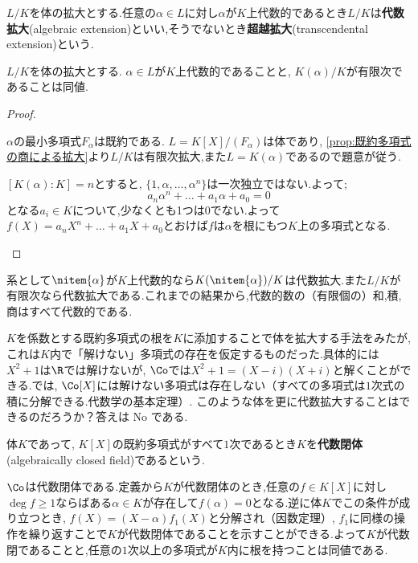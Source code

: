 \begin{defi}
	$L/K$を体の拡大とする.任意の$\alpha\in L$に対し$\alpha$が$K$上代数的であるとき$L/K$は\textbf{代数拡大}(algebraic extension)といい,そうでないとき\textbf{超越拡大}(transcendental extension)という.
\end{defi}

\begin{prop}
	$L/K$を体の拡大とする. $\alpha\in L$が$K$上代数的であることと, $K(\alpha)/K$が有限次であることは同値.
\end{prop}

\begin{proof}
	\begin{eqv}
		\item $\alpha$の最小多項式$F_\alpha$は既約である. $L=K[X]/(F_\alpha)$は体であり, \ref{prop:既約多項式の商による拡大}より$L/K$は有限次拡大,また$L=K(\alpha)$であるので題意が従う.
		
		\item $[K(\alpha):K]=n$とすると, $\{1,\alpha,\dots,\alpha^n\}$は一次独立ではない.よって;
		\[a_n\alpha^n+\dots+a_1\alpha+a_0=0\]
		となる$a_i\in K$について,少なくとも1つは0でない.よって$f(X)=a_nX^n+\dots+a_1X+a_0$とおけば$f$は$\alpha$を根にもつ$K$上の多項式となる.
	\end{eqv}
\end{proof}

系として$\nitem{\alpha}$が$K$上代数的なら$K(\nitem{\alpha})/K$は代数拡大.また$L/K$が有限次なら代数拡大である.これまでの結果から,代数的数の（有限個の）和,積,商はすべて代数的である.

$K$を係数とする既約多項式の根を$K$に添加することで体を拡大する手法をみたが,これは$K$内で「解けない」多項式の存在を仮定するものだった.具体的には$X^2+1$は$\R$では解けないが, $\Co$では$X^2+1=(X-i)(X+i)$と解くことができる.では, $\Co[X]$には解けない多項式は存在しない（すべての多項式は$1$次式の積に分解できる.代数学の基本定理）. このような体を更に代数拡大することはできるのだろうか？答えは No である.

\begin{defi}[代数閉体]
	体$K$であって, $K[X]$の既約多項式がすべて$1$次であるとき$K$を\textbf{代数閉体}(algebraically closed field)であるという.
\end{defi}

$\Co$は代数閉体である.定義から$K$が代数閉体のとき,任意の$f\in K[X]$に対し$\deg f\geq1$ならばある$\alpha\in K$が存在して$f(\alpha)=0$となる.逆に体$K$でこの条件が成り立つとき, $f(X)=(X-\alpha)f_1(X)$と分解され（因数定理）,  $f_1$に同様の操作を繰り返すことで$K$が代数閉体であることを示すことができる.よって$K$が代数閉であることと,任意の$1$次以上の多項式が$K$内に根を持つことは同値である.


